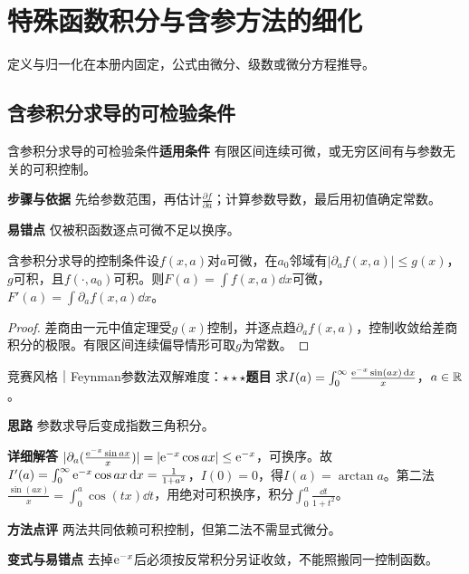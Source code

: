 \section{特殊函数积分与含参方法的细化}\label{deep:integral_special_deep}

\begin{examtip}定义与归一化在本册内固定，公式由微分、级数或微分方程推导。\end{examtip}

\subsection{含参积分求导的可检验条件}\label{deep:integral_special_deep:parameter}

\begin{method}{含参积分求导的可检验条件}\textbf{适用条件} 有限区间连续可微，或无穷区间有与参数无关的可积控制。\par\textbf{步骤与依据} 先给参数范围，再估计$\frac{\partial f}{\partial a}$；计算参数导数，最后用初值确定常数。\par\textbf{易错点} 仅被积函数逐点可微不足以换序。\end{method}

\begin{theorem}{含参积分求导的控制条件}设$f(x,a)$对$a$可微，在$a_0$邻域有$|\partial_af(x,a)|\le g(x)$，$g$可积，且$f(\cdot,a_0)$可积。则$F(a)=\int f(x,a)\dd x$可微，$F'(a)=\int\partial_af(x,a)\dd x$。\end{theorem}\begin{proof}差商由一元中值定理受$g(x)$控制，并逐点趋$\partial_af(x,a)$，控制收敛给差商积分的极限。有限区间连续偏导情形可取$g$为常数。\end{proof}

\begin{example}{竞赛风格｜Feynman参数法双解}{难度：$\star\star\star$}\label{deep:ex:integral_special_deep:arctanparam}\textbf{题目} 求$I(a)=\int_0^\infty\frac{\mathrm{e}^{-x}\sin(ax)\mathop{}\!\mathrm{d} x}{x}$，$a\in\mathbb{R}$。\par\textbf{思路} 参数求导后变成指数三角积分。\par\textbf{详细解答} $|\partial_a(\frac{\mathrm{e}^{-x}\sin ax}{x})|=|\mathrm{e}^{-x}\cos ax|\le\mathrm{e}^{-x}$，可换序。故$I'(a)=\int_0^\infty\mathrm{e}^{-x}\cos ax\mathop{}\!\mathrm{d} x=\frac{1}{1+a^2}$，$I(0)=0$，得$I(a)=\arctan a$。第二法$\frac{\sin(ax)}{x}=\int_0^a\cos(tx)\dd t$，用绝对可积换序，积分$\int_0^a\frac{\dd t}{1+t^2}$。\par\textbf{方法点评} 两法共同依赖可积控制，但第二法不需显式微分。\par\textbf{变式与易错点} 去掉$\mathrm{e}^{-x}$后必须按反常积分另证收敛，不能照搬同一控制函数。\end{example}

